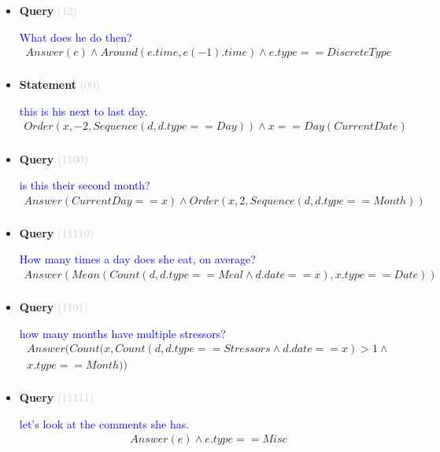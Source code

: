 \documentclass[11pt]{article}
\newcommand{\key}[1]{\textcolor{lightgray}{#1}}
\newcounter{CQuery}
\newcounter{CStatement}
\begin{document}
\begin{itemize}
\item
\textbf{Query\theCQuery} \key{(12)} \addtocounter{CQuery}{1}
\textcolor{blue}{ What does he do then? }
\begin{multline*}
Answer(e) \wedge Around(e.time, e(-1).time) \wedge e.type==DiscreteType \\ 
\end{multline*}


\item
\textbf{Statement\theCStatement} \key{(00)} \addtocounter{CStatement}{1}
\textcolor{blue}{ this is his next to last day. }
\begin{multline*}
Order(x, -2, Sequence(d, d.type==Day)) \wedge x==Day(CurrentDate) \\ 
\end{multline*}


\item
\textbf{Query\theCQuery} \key{(1100)} \addtocounter{CQuery}{1}
\textcolor{blue}{ is this their second month? }
\begin{multline*}
Answer(CurrentDay==x) \wedge Order(x, 2, Sequence(d, d.type==Month)) \\ 
\end{multline*}


\item
\textbf{Query\theCQuery} \key{(11110)} \addtocounter{CQuery}{1}
\textcolor{blue}{ How many times a day does she eat, on average? }
\begin{multline*}
Answer(Mean(Count(d, d.type==Meal \wedge d.date==x), x.type==Date)) \\ 
\end{multline*}


\item
\textbf{Query\theCQuery} \key{(1101)} \addtocounter{CQuery}{1}
\textcolor{blue}{ how many months have multiple stressors? }
\begin{multline*}
Answer(Count(x, Count(d, d.type==Stressors \wedge d.date==x)>1 \wedge \\ 
x.type==Month)) \\ 
\end{multline*}


\item
\textbf{Query\theCQuery} \key{(11111)} \addtocounter{CQuery}{1}
\textcolor{blue}{ let's look at the comments she has. }
\begin{multline*}
Answer(e) \wedge e.type==Misc \\ 
\end{multline*}



\end{itemize}
\end{document}
